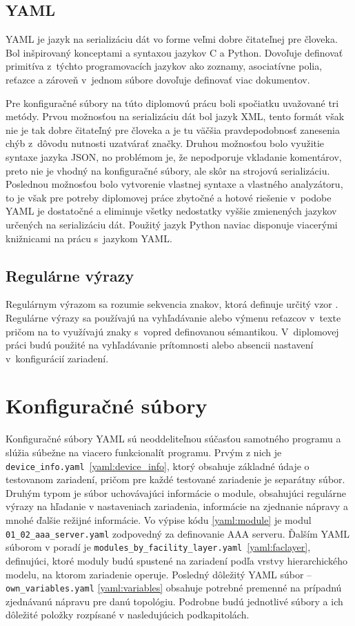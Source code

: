  \subsection{YAML}
 YAML \cite{Jd4UTaVyTULvXDoN} je jazyk na serializáciu dát vo forme veľmi dobre čitateľnej pre človeka. Bol inšpirovaný konceptami a syntaxou jazykov C a Python. Dovoľuje definovať primitíva z~týchto programovacích jazykov ako zoznamy, asociatívne polia, reťazce a zároveň v~jednom súbore dovoľuje definovať viac dokumentov.
 
 Pre konfiguračné súbory na túto diplomovú prácu boli spočiatku uvažované tri metódy. Prvou možnosťou na serializáciu dát bol jazyk XML, tento formát však nie je tak dobre čitateľný pre človeka a je tu väčšia pravdepodobnosť zanesenia chýb z~dôvodu nutnosti uzatvárať značky. Druhou možnosťou bolo využitie syntaxe jazyka JSON, no problémom je, že nepodporuje vkladanie komentárov, preto nie je vhodný na konfiguračné súbory, ale skôr na strojovú serializáciu. Poslednou možnosťou bolo vytvorenie vlastnej syntaxe a vlastného analyzátoru, to je však pre potreby diplomovej práce zbytočné a hotové riešenie v~podobe YAML je dostatočné a eliminuje všetky nedostatky vyššie zmienených jazykov určených na serializáciu dát. Použitý jazyk Python naviac disponuje viacerými knižnicami na prácu s~jazykom YAML.  
 \subsection{Regulárne výrazy}
 Regulárnym výrazom sa rozumie sekvencia znakov, ktorá definuje určitý vzor \cite{sBBUt3Q3bPUfAMue}. Regulárne výrazy sa používajú na vyhľadávanie alebo výmenu reťazcov v~texte pričom na to využívajú znaky s~vopred definovanou sémantikou. V~diplomovej práci budú použité na vyhľadávanie prítomnosti alebo absencii nastavení v~konfigurácií zariadení. 

\section{Konfiguračné súbory}
Konfiguračné súbory YAML sú neoddeliteľnou súčasťou samotného programu a slúžia súbežne na viacero funkcionalít programu. Prvým z nich je \mbox{\texttt{device\_info.yaml} \ref{yaml:device_info}}, ktorý obsahuje základné údaje o testovanom zariadení, pričom pre každé testované zariadenie je separátny súbor. Druhým typom je súbor uchovávajúci informácie o module, obsahujúci regulárne výrazy na hľadanie v nastaveniach zariadenia, informácie na zjednanie nápravy a mnohé ďalšie režijné informácie. Vo výpise kódu \ref{yaml:module} je modul \texttt{01\_02\_aaa\_server.yaml} zodpovedný za definovanie AAA serveru. Ďalším YAML súborom v poradí je \mbox{\texttt{modules\_by\_facility\_layer.yaml} \ref{yaml:faclayer}}, definujúci, ktoré moduly budú spustené na zariadení podľa vrstvy hierarchického modelu, na ktorom zariadenie operuje. Posledný dôležitý YAML súbor -- \texttt{own\_variables.yaml} \ref{yaml:variables} obsahuje potrebné premenné na prípadnú zjednávanú nápravu pre danú topológiu. Podrobne budú jednotlivé súbory a ich dôležité položky rozpísané v nasledujúcich podkapitolách.
